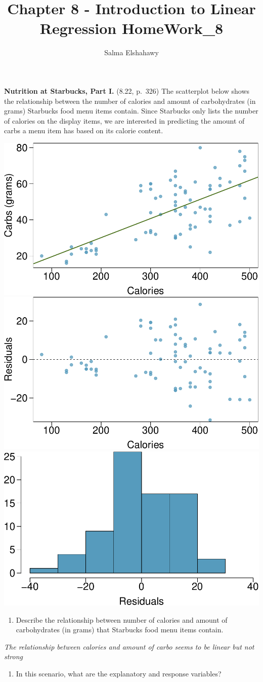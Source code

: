 \documentclass[]{article}
\title{Chapter 8 - Introduction to Linear Regression HomeWork\_8}
\author{Salma Elshahawy}
\date{}
\providecommand{\tightlist}{%
  \setlength{\itemsep}{0pt}\setlength{\parskip}{0pt}}
\begin{document}
\maketitle

\textbf{Nutrition at Starbucks, Part I.} (8.22, p.~326) The scatterplot
below shows the relationship between the number of calories and amount
of carbohydrates (in grams) Starbucks food menu items contain. Since
Starbucks only lists the number of calories on the display items, we are
interested in predicting the amount of carbs a menu item has based on
its calorie content.

\includegraphics[width=0.33\linewidth]{Homework_8_files/figure-latex/unnamed-chunk-1-1}
\includegraphics[width=0.33\linewidth]{Homework_8_files/figure-latex/unnamed-chunk-1-2}
\includegraphics[width=0.33\linewidth]{Homework_8_files/figure-latex/unnamed-chunk-1-3}

\begin{enumerate}
\def\labelenumi{(\alph{enumi})}
\tightlist
\item
  Describe the relationship between number of calories and amount of
  carbohydrates (in grams) that Starbucks food menu items contain.
\end{enumerate}

\emph{The relationship between calories and amount of carbo seems to be
linear but not strong}

\begin{enumerate}
\def\labelenumi{(\alph{enumi})}
\setcounter{enumi}{1}
\tightlist
\item
  In this scenario, what are the explanatory and response variables?
\end{enumerate}
\end{document}
